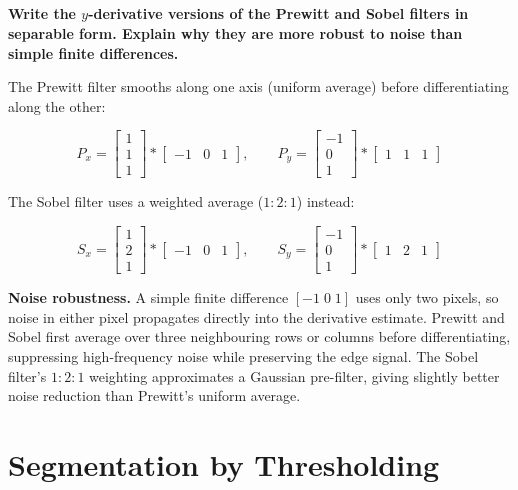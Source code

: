 \documentclass[12pt]{article} %
\begin{document}
\subsection{}
\textbf{Write the $y$-derivative versions of the Prewitt and Sobel filters in separable form. Explain why they are more robust to noise than simple finite differences.}

The Prewitt filter smooths along one axis (uniform average) before differentiating along the other:

$$P_x = \begin{bmatrix}1\\1\\1\end{bmatrix} * \begin{bmatrix}-1 & 0 & 1\end{bmatrix}, \qquad P_y = \begin{bmatrix}-1\\0\\1\end{bmatrix} * \begin{bmatrix}1 & 1 & 1\end{bmatrix}$$

The Sobel filter uses a weighted average ($1\!:\!2\!:\!1$) instead:

$$S_x = \begin{bmatrix}1\\2\\1\end{bmatrix} * \begin{bmatrix}-1 & 0 & 1\end{bmatrix}, \qquad S_y = \begin{bmatrix}-1\\0\\1\end{bmatrix} * \begin{bmatrix}1 & 2 & 1\end{bmatrix}$$

\textbf{Noise robustness.} A simple finite difference $[-1\; 0\; 1]$ uses only two pixels, so noise in either pixel propagates directly into the derivative estimate. Prewitt and Sobel first average over three neighbouring rows or columns before differentiating, suppressing high-frequency noise while preserving the edge signal. The Sobel filter's $1\!:\!2\!:\!1$ weighting approximates a Gaussian pre-filter, giving slightly better noise reduction than Prewitt's uniform average.

\section{Segmentation by Thresholding}
\end{document}
